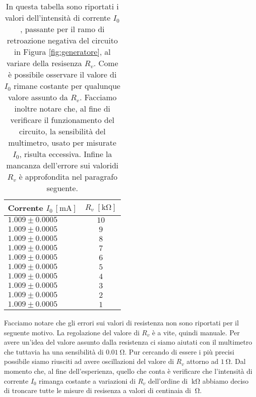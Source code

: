\begin{SCtable}[2]
    \centering
    \small
    \begin{tabular}{l | c}
        \toprule
		Corrente $I_0 \, [\si{\milli\ampere}]$ & $R_v \; [\si{\kilo\ohm}]$ \\
        \midrule
		$ 1.009 \pm 0.0005 $ & $ 10 $ \\
		$ 1.009 \pm 0.0005 $ & $ 9 $ \\
		$ 1.009 \pm 0.0005 $ & $ 8 $ \\
		$ 1.009 \pm 0.0005 $ & $ 7 $ \\
		$ 1.009 \pm 0.0005 $ & $ 6 $ \\
		$ 1.009 \pm 0.0005 $ & $ 5 $ \\
		$ 1.009 \pm 0.0005 $ & $ 4 $ \\
		$ 1.009 \pm 0.0005 $ & $ 3 $ \\
		$ 1.009 \pm 0.0005 $ & $ 2 $ \\
		$ 1.009 \pm 0.0005 $ & $ 1 $ \\
        \bottomrule
    \end{tabular}
    \caption{In questa tabella sono riportati i valori dell'intensità di corrente $I_0$, passante per il ramo di retroazione negativa del circuito in Figura \ref{fig:generatore}, al variare della resisenza $R_v$. Come è possibile osservare il valore di $I_0$ rimane costante per qualunque valore assunto da $R_v$. Facciamo inoltre notare che, al fine di verificare il funzionamento del circuito, la sensibilità del multimetro, usato per misurate $I_0$, risulta eccessiva. Infine la mancanza dell'errore sui valoridi $R_v$ è approfondita nel paragrafo seguente.}
    \label{tab:corr_res}
\end{SCtable}

Facciamo notare che gli errori sui valori di resistenza non sono riportati per il seguente motivo. 
La regolazione del valore di $R_v$ è a vite, quindi manuale.
Per avere un'idea del valore assunto dalla resistenza ci siamo aiutati con il multimetro che tuttavia ha una sensibilità di $\SI{0.01}{\ohm}$. Pur cercando di essere i più precisi possibile siamo riusciti ad avere oscillazioni del valore di $R_v$ attorno ad $\SI{1}{\ohm}$. Dal momento che, al fine dell'esperienza, quello che conta è verificare che l'intensità di corrente $I_0$ rimanga costante a variazioni di $R_v$ dell'ordine di $\SI{}{\kilo\ohm}$ abbiamo deciso di troncare tutte le misure di resisenza a valori di centinaia di $\SI{}{\ohm}$.

